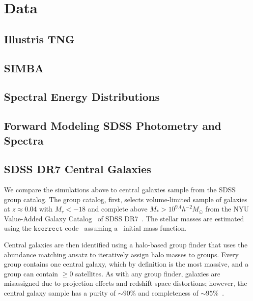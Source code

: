 \section{Data}\label{sec:sims}
\subsection{Illustris TNG} \label{sec:tng}

\subsection{SIMBA} \label{sec:tng}

\subsection{Spectral Energy Distributions} \label{sec:sed}

\subsection{Forward Modeling SDSS Photometry and Spectra} \label{sec:fm} 


\subsection{SDSS DR7 Central Galaxies} \label{sec:obs} 
We compare the simulations above to central galaxies sample from the \cite{tinker2011} SDSS group catalog. The
\cite{tinker2011} group catalog, first, selects volume-limited sample of galaxies 
at $z \approx 0.04$ with $M_r < -18$ and complete above $M_* > 10^{9.4}
h^{-2}M_\odot$ from the NYU Value-Added Galaxy Catalog~\citep[VAGC;][]{blanton2005} 
of SDSS DR7~\citep{abazajian2009}. The stellar masses are estimated using the
$\mathtt{kcorrect}$ code~\citep{blanton2007a} assuming a~\cite{chabrier2003}
initial mass function.

Central galaxies are then identified using a halo-based group finder that uses
the abundance matching ansatz to iteratively  assign halo masses to groups.
Every group contains one central galaxy, which by definition is the most
massive, and a group can contain $\ge0$ satellites. As with any group finder,
galaxies are misassigned due to projection effects and redshift space
distortions; however, the central galaxy sample has a purity of ${\sim}90\%$
and completeness of ${\sim}95\%$~\citep{tinker2018}. 

